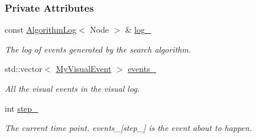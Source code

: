 \subsubsection*{Private Attributes}
\begin{DoxyCompactItemize}
\item 
const \hyperlink{structslb_1_1core_1_1ui_1_1AlgorithmLog}{Algorithm\+Log}$<$ Node $>$ \& \hyperlink{structslb_1_1core_1_1ui_1_1VisualLog_ab9a434607ee2f04a8a3ee26b0ab8995b}{log\+\_\+}\hypertarget{structslb_1_1core_1_1ui_1_1VisualLog_ab9a434607ee2f04a8a3ee26b0ab8995b}{}\label{structslb_1_1core_1_1ui_1_1VisualLog_ab9a434607ee2f04a8a3ee26b0ab8995b}

\begin{DoxyCompactList}\small\item\em The log of events generated by the search algorithm. \end{DoxyCompactList}\item 
std\+::vector$<$ \hyperlink{structslb_1_1core_1_1ui_1_1VisualLog_a6c09f9d1c9f6159c6a151a2795b5295e}{My\+Visual\+Event} $>$ \hyperlink{structslb_1_1core_1_1ui_1_1VisualLog_aadbacf1ca890b882e4ba8fa916a169ac}{events\+\_\+}\hypertarget{structslb_1_1core_1_1ui_1_1VisualLog_aadbacf1ca890b882e4ba8fa916a169ac}{}\label{structslb_1_1core_1_1ui_1_1VisualLog_aadbacf1ca890b882e4ba8fa916a169ac}

\begin{DoxyCompactList}\small\item\em All the visual events in the visual log. \end{DoxyCompactList}\item 
int \hyperlink{structslb_1_1core_1_1ui_1_1VisualLog_ac76dac95a4434e363099d8d34bde6e5e}{step\+\_\+}\hypertarget{structslb_1_1core_1_1ui_1_1VisualLog_ac76dac95a4434e363099d8d34bde6e5e}{}\label{structslb_1_1core_1_1ui_1_1VisualLog_ac76dac95a4434e363099d8d34bde6e5e}

\begin{DoxyCompactList}\small\item\em The current time point. events\+\_\+\mbox{[}step\+\_\+\mbox{]} is the event about to happen. \end{DoxyCompactList}\end{DoxyCompactItemize}
